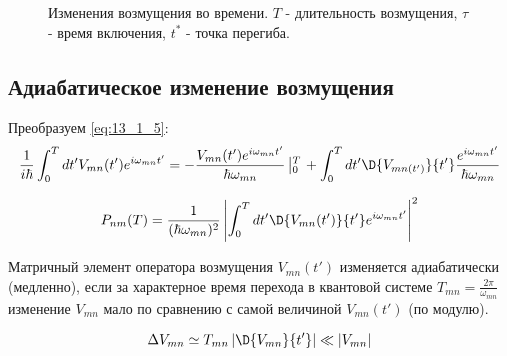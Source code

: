 \begin{figure}[h!]
\centering
{}
\caption{Изменения возмущения во времени. $T$ - длительность возмущения, $\tau$ - время включения, $t^*$ - точка перегиба.} \label{fig:13_1}
\end{figure}


\subsection{Адиабатическое изменение возмущения}

Преобразуем \eqref{eq:13_1_5}:
\begin{eqnarray*}
\frac{1}{i\hbar} \int_0^T dt' V_{mn}(t')e^{i\omega_{mn}t'} = - \frac{V_{mn}(t')e^{i \omega_{mn}t'}}{\hbar \omega_{mn}}\left|_0^T \right .+ \int_0^T dt' \D{V_{mn(t')}}{t'} \frac{e^{i\omega_{mn}t'}}{\hbar \omega_{mn}}
\end{eqnarray*}

\begin{equation}
\label{eq:13_3_1}
P_{nm}(T) = \frac{1}{(\hbar \omega_{mn})^2} \left| \int_0^T dt' \D{V_{mn}(t')}{t'} e^{i\omega_{mn}t'}\right|^2
\end{equation}

\begin{defn}
Матричный элемент оператора возмущения $V_{mn}(t')$ изменяется адиабатически (медленно), если за характерное время перехода в квантовой системе $T_{mn} = \frac{2\pi}{\omega_{mn}}$ изменение $V_{mn}$ мало по сравнению с самой величиной $V_{mn}(t')$ (по модулю).
\end{defn}

\begin{equation}
\label{eq:13_3_2}
\Delta V_{mn}  \simeq T_{mn} \left| \D{V_{mn}}{t'}\right| \ll |V_{mn}|
\end{equation}

